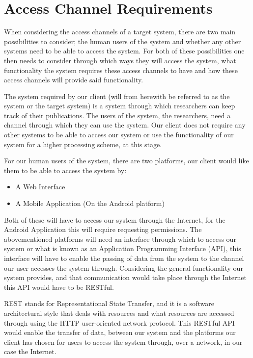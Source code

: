 \documentclass{article}
\author{Hlengekile Jita - u14077893}
\begin{document}
\section{Access Channel Requirements}
When considering the access channels of a target system, there are two main possibilities to consider; the human users of the system and whether any other systems need to be able to access the system. For both of these possibilities one then needs to consider through which ways they will access the system, what functionality the system requires these access channels to have and how these access channels will provide said functionality. 

The system required by our client (will from herewith be referred to as the system or the target system) is a system through which researchers can keep track of their publications. The users of the system, the researchers, need a channel through which they can use the system. Our client does not require any other systems to be able to access our system or use the functionality of our system for a higher processing scheme, at this stage.

For our human users of the system, there are two platforms, our client would like them to be able to access the system by:
\begin{itemize}
	\item A Web Interface
	\item A Mobile Application (On the Android platform)
\end{itemize}

Both of these will have to access our system through the Internet, for the Android Application this will require requesting permissions. The abovementioned platforms will need an interface through which to access our system or what is known as an Application Programming Interface (API), this interface will have to enable the passing of data from the system to the channel our user accesses the system through. Considering the general functionality our system provides, and that communication would take place through the Internet this API would have to be RESTful.

REST stands for Representational State Transfer, and it is a software architectural style that deals with resources and what resources are accessed through using the HTTP user-oriented network protocol. This RESTful API would enable the transfer of data, between our system and the platforms our client has chosen for users to access the system through, over a network, in our case the Internet.
\end{document}
